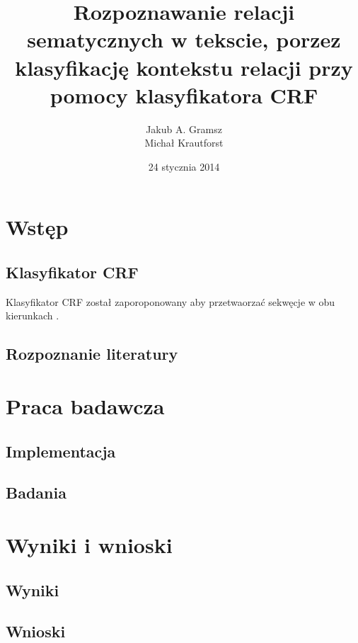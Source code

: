 \documentclass[a4paper,10pt]{report}
\title{Rozpoznawanie relacji sematycznych w tekscie, porzez klasyfikację kontekstu relacji przy pomocy klasyfikatora CRF}
\author{Jakub A. Gramsz \\ Michał Krautforst}
\date{24 stycznia 2014}
\begin{document}
\renewcommand{\figurename}{Wykres}
\renewcommand{\chaptername}{}

\maketitle
\tableofcontents

\chapter{Wstęp}

\section{Klasyfikator CRF}

Klasyfikator CRF został zaporoponowany aby przetwaorzać sekwęcje w obu kierunkach \cite{lafferty2001crf}.

\section{Rozpoznanie literatury}

\chapter{Praca badawcza}

\section{Implementacja}

\section{Badania}

\chapter{Wyniki i wnioski}

\section{Wyniki}

\section{Wnioski}


\nocite{*}

\end{document}
